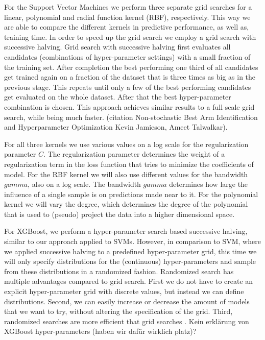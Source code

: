For the Support Vector Machines we perform three separate grid searches for a linear, polynomial and radial function kernel (RBF), respectively.
This way we are able to compare the different kernels in predictive performance, as well as, training time.
In order to speed up the grid search we employ a grid search with successive halving. 
Grid search with successive halving first evaluates all candidates (combinations of hyper-parameter settings) with a small fraction of the training set.
After completion the best performing one third of all candidates get trained again on a fraction of the dataset that is three times as big as in the previous stage.
This repeats until only a few of the  best performing candidates get evaluated on the whole dataset.
After that the best hyper-parameter combination is chosen.
This approach achieves similar results to a full scale grid search, while being much faster. (citation Non-stochastic Best Arm Identification and Hyperparameter Optimization
Kevin Jamieson, Ameet Talwalkar).

For all three kernels we use various values on a log scale for the regularization parameter \(C\).
The regularization parameter determines the weight of a regularization term in the loss function that tries to minimize the coefficients of model.
For the RBF kernel we will also use different values for the bandwidth \(gamma\), also on a log scale.
The bandwidth \(gamma\) determines how large the influence of a single sample is on predictions made near to it.
For the polynomial kernel we will vary the degree, which determines the degree of the polynomial that is used to (pseudo) project the data into a higher dimensional space.  

For XGBoost, we perform a hyper-parameter search based successive halving, similar to our approach applied to SVMs. 
However, in comparison to SVM, where we applied successive halving to a predefined hyper-parameter grid, this time we will only specify distributions for the (continuous) hyper-parameters and sample from these distributions in a randomized fashion.
Randomized search has multiple advantages compared to grid search.
First we do not have to create an explicit hyper-parameter grid with discrete values, but instead we can define distributions. Second, we can easily increase or decrease the amount of models that we want to try, without altering the specification of the grid. Third, randomized searches are more efficient that grid searches .
Kein erklärung von XGBoost hyper-parameters (haben wir dafür wirklich platz)?


